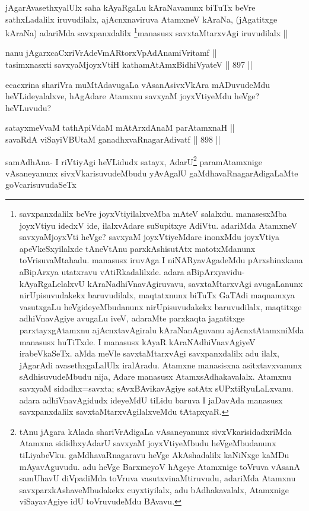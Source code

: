 \begin{artha}
jAgarAvasethxyalUlx saha kAyaRgaLu kAraNavanunx biTuTx beVre sathxLadalilx iruvudilalx, ajAcnxnaviruva AtamxneV kAraNa, (jAgatitxge kAraNa) adariMda savxpanxdalilx \footnote{savxpanxdalilx beVre joyxVtiyilalxveMba mAteV salalxdu. manasesxMba joyxVtiyu idedxV ide, ilalxvAdare suSupitxye AdiVtu. adariMda AtamxneV savxyaMjoyxVti heVge? savxyaM joyxVtiyeMdare inonxMdu joyxVtiya apeVkeSxyilalxde tAneVtAnu parxkAshisutAtx matotxMdanunx toVrisuvaMtahadu. manasusx iruvAga I niNARyavAgadeMdu pArxshinxkana aBipArxya utatxravu vAtiRkadalilxde. adara aBipArxyavidu-kAyaRgaLelalxvU kAraNadhiVnavAgiruvavu, savxtaMtarxvAgi avugaLanunx nirUpisuvudakekx baruvudilalx, maqtatxnunx biTuTx GaTAdi maqnamxya vasutxgaLu  heVgideyeMbudanunx nirUpisuvudakekx baruvudilalx, maqtitxge adhiVnavAgiye avugaLu iveV, adaraMte parxkaqta jagatitxge parxtayxgAtamxnu ajAcnxtavAgiralu kAraNanAguvanu ajAcnxtAtamxniMda manasusx huTiTxde. I manasusx kAyaR kAraNAdhiVnavAgiyeV irabeVkaSeTx. aMda meVle savxtaMtarxvAgi savxpanxdalilx adu ilalx, jAgarAdi avasethxgaLalUlx iralAradu. Atamxne manasisxna asitxtavxvanunx sAdhisuvudeMbudu nija, Adare manasusx AtamxsAdhakavalalx. Atamxnu savxyaM sidadhx=savxta; sAvxBAvikavAgiye satAtx sUPxtiRyuLaLxvanu. adara adhiVnavAgidudx ideyeMdU tiLidu baruva I jaDavAda manasusx savxpanxdalilx savxtaMtarxvAgilalxveMdu tAtapxyaR.}manasusx savxtaMtarxvAgi iruvudilalx ||
\end{artha}


\begin{shl}
nanu jAgarxcaCxriVrAdeVmARtorxVpAdAnamiVritamf || \\
tasimxnasxti savxyaMjoyxVtiH kathamAtAmx\s BidhiVyateV ||  897 ||  
\end{shl}

\begin{artha}
ecacxrina shariVra muMtAdavugaLa vAsanAsivxVkAra mADuvudeMdu heVLideyalalxve, hAgAdare Atamxnu savxyaM joyxVtiyeMdu heVge? heVLuvudu?
\end{artha}

\begin{shl}
satayxmeVvaM tathA\s piVdaM mAtArxdAnaM parAtamxnaH || \\
savaRdA viSayiVBUtaM ganadhxvaRnagarAdivatf ||  898 ||  
\end{shl}

\begin{artha}
samAdhAna- I riVtiyAgi heVLidudx satayx, AdarU\footnote{tAnu jAgara kAlada shariVrAdigaLa vAsaneyanunx sivxVkarisidadxriMda Atamxna sididhxyAdarU savxyaM joyxVtiyeMbudu heVgeMbudanunx tiLiyabeVku. gaMdhavaRnagaravu heVge AkAshadalilx kaNiNxge kaMDu mAyavAguvudu. adu heVge BarxmeyoV hAgeye Atamxnige toVruva vAsanA samUhavU diVpadiMda toVruva vasutxvinaMtiruvudu, adariMda Atamxnu savxparxkAshaveMbudakekx cuyxtiyilalx, adu bAdhakavalalx, Atamxnige viSayavAgiye idU toVruvudeMdu BAvavu.} paramAtamxnige vAsaneyanunx sivxVkarisuvudeMbudu yAvAgalU gaMdhavaRnagarAdigaLaMte goVcarisuvudaSeTx
\end{artha}

